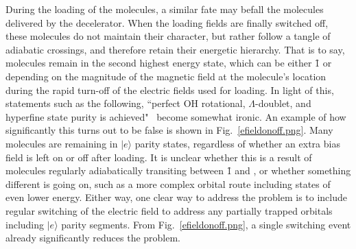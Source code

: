 \documentclass[defaultstyle,11pt]{thesis}
\begin{document}

During the loading of the molecules, a similar fate may befall the  molecules delivered by the decelerator.
When the loading fields are finally switched off, these molecules do not maintain their  character, but rather follow a tangle of adiabatic crossings, and therefore retain their energetic hierarchy.
That is to say,  molecules remain in the second highest energy state, which can be either \f1 or  depending on the magnitude of the magnetic field at the molecule's location during the rapid turn-off of the electric fields used for loading.
In light of this, statements such as the following, ``perfect OH rotational, $\Lambda$-doublet, and hyperfine state purity is achieved"~\citep[Page.~19061, Top Right]{Sawyer2011} become somewhat ironic.
An example of how significantly this turns out to be false is shown in Fig.~\ref{efieldonoff.png}.
Many molecules are remaining in $|e\rangle$ parity states, regardless of whether an extra bias field is left on or off after loading.
It is unclear whether this is a result of molecules regularly adiabatically transiting between \f1 and , or whether something different is going on, such as a more complex orbital route including states of even lower energy.
Either way, one clear way to address the problem is to include regular switching of the electric field to address any partially trapped orbitals including $|e\rangle$ parity segments.
From Fig.~\ref{efieldonoff.png}, a single switching event already significantly reduces the problem.

\end{document}
